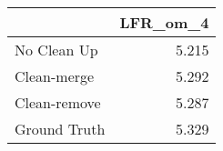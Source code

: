 \begin{tabular}{lr}
\toprule
{} & LFR_om_4 \\
\midrule
No Clean Up  &    5.215 \\
Clean-merge  &    5.292 \\
Clean-remove &    5.287 \\
Ground Truth &    5.329 \\
\bottomrule
\end{tabular}
